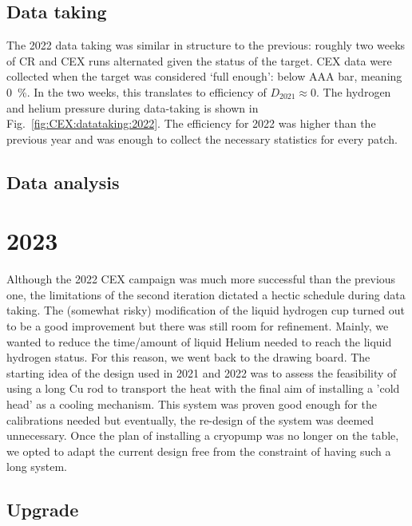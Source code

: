 \begin{refsection}
    \subsection{Data taking}
        The 2022 data taking was similar in structure to the previous: roughly two weeks of CR and CEX runs alternated given the status of the target.
        CEX data were collected when the target was considered `full enough': below AAA bar, meaning \SI{0}{\%}. 
        In the two weeks, this translates to efficiency of $D_{2021}\approx0$.
        The hydrogen and helium pressure during data-taking is shown in Fig.~\ref{fig:CEX:datataking:2022}.
        The efficiency for 2022 was higher than the previous year and was enough to collect the necessary statistics for every patch.
        
    \subsection{Data analysis}


\section{2023}
    Although the 2022 CEX campaign was much more successful than the previous one, the limitations of the second iteration dictated a hectic schedule during data taking. 
    The (somewhat risky) modification of the liquid hydrogen cup turned out to be a good improvement but there was still room for refinement. 
    Mainly, we wanted to reduce the time/amount of liquid Helium needed to reach the liquid hydrogen status. 
    For this reason, we went back to the drawing board.
    The starting idea of the design used in 2021 and 2022 was to assess the feasibility of using a long Cu rod to transport the heat with the final aim of installing a 'cold head' as a cooling mechanism.
    This system was proven good enough for the calibrations needed but eventually, the re-design of the system was deemed unnecessary.
    Once the plan of installing a cryopump was no longer on the table, we opted to adapt the current design free from the constraint of having such a long system. 

    \subsection{Upgrade}

\end{refsection}
